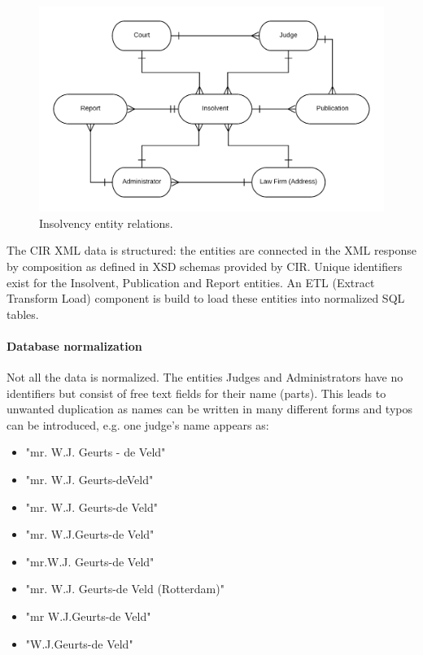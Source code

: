 \begin{figure}[h]
\includegraphics[width=1\linewidth]{cir_erd.png}
\caption{Insolvency entity relations.}
\end{figure}

The CIR XML data is structured: the entities are connected in the XML response by composition as defined in XSD schemas provided by CIR. Unique identifiers exist for the Insolvent, Publication and Report entities. An ETL (Extract Transform Load) component is build to load these entities into normalized SQL tables.

\paragraph{Database normalization}
Not all the data is normalized. The entities Judges and Administrators have no identifiers but consist of free text fields for their name (parts). This leads to unwanted duplication as names can be written in many different forms and typos can be introduced, e.g. one judge's name appears as:

\begin{itemize}
\item "mr. W.J. Geurts - de Veld"
\item "mr. W.J. Geurts-deVeld"
\item "mr. W.J. Geurts-de Veld"
\item "mr. W.J.Geurts-de Veld"
\item "mr.W.J. Geurts-de Veld"
\item "mr. W.J. Geurts-de Veld (Rotterdam)"
\item "mr W.J.Geurts-de Veld"
\item "W.J.Geurts-de Veld"
\end{itemize}

